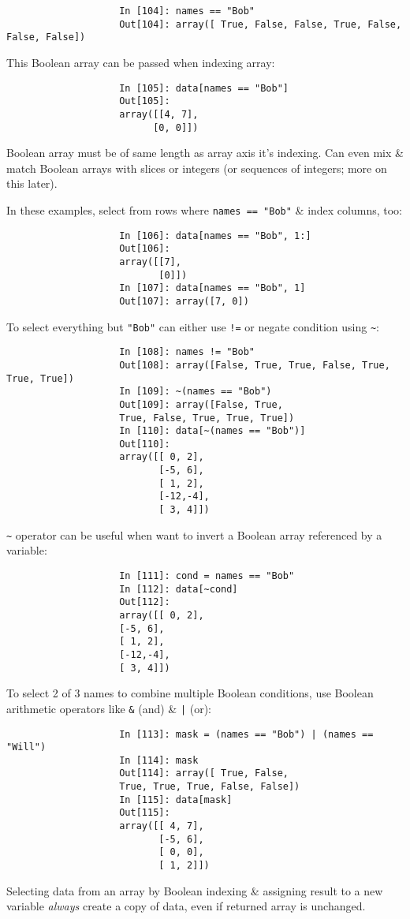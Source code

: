 \documentclass{article}
\begin{document}
\begin{enumerate}
\begin{itemize}
\begin{itemize}
\begin{itemize}
				\begin{verbatim}
					In [104]: names == "Bob"
					Out[104]: array([ True, False, False, True, False, False, False])
				\end{verbatim}
				This Boolean array can be passed when indexing array:
				\begin{verbatim}
					In [105]: data[names == "Bob"]
					Out[105]:
					array([[4, 7],
					      [0, 0]])
				\end{verbatim}
				Boolean array must be of same length as array axis it's indexing. Can even mix \& match Boolean arrays with slices or integers (or sequences of integers; more on this later).
				
				In these examples, select from rows where {\tt names == "Bob"} \& index columns, too:
				\begin{verbatim}
					In [106]: data[names == "Bob", 1:]
					Out[106]:
					array([[7],
					       [0]])
					In [107]: data[names == "Bob", 1]
					Out[107]: array([7, 0])
				\end{verbatim}
				To select everything but {\tt"Bob"} can either use {\tt!=} or negate condition using \verb|~|:
				\begin{verbatim}
					In [108]: names != "Bob"
					Out[108]: array([False, True, True, False, True, True, True])
					In [109]: ~(names == "Bob")
					Out[109]: array([False, True,
					True, False, True, True, True])
					In [110]: data[~(names == "Bob")]
					Out[110]:
					array([[ 0, 2],
					       [-5, 6],
					       [ 1, 2],
					       [-12,-4],
					       [ 3, 4]])
				\end{verbatim}
				\verb|~| operator can be useful when want to invert a Boolean array referenced by a variable:
				\begin{verbatim}
					In [111]: cond = names == "Bob"
					In [112]: data[~cond]
					Out[112]:
					array([[ 0, 2],
					[-5, 6],
					[ 1, 2],
					[-12,-4],
					[ 3, 4]])
				\end{verbatim}
				To select 2 of 3 names to combine multiple Boolean conditions, use Boolean arithmetic operators like {\tt\&} (and) \& {\tt|} (or):
				\begin{verbatim}
					In [113]: mask = (names == "Bob") | (names == "Will")
					In [114]: mask
					Out[114]: array([ True, False,
					True, True, True, False, False])
					In [115]: data[mask]
					Out[115]:
					array([[ 4, 7],
					       [-5, 6],
					       [ 0, 0],
					       [ 1, 2]])
				\end{verbatim}
				Selecting data from an array by Boolean indexing \& assigning result to a new variable {\it always} create a copy of data, even if returned array is unchanged.

\end{itemize}
\end{itemize}
\end{itemize}
\end{enumerate}
\end{document}
